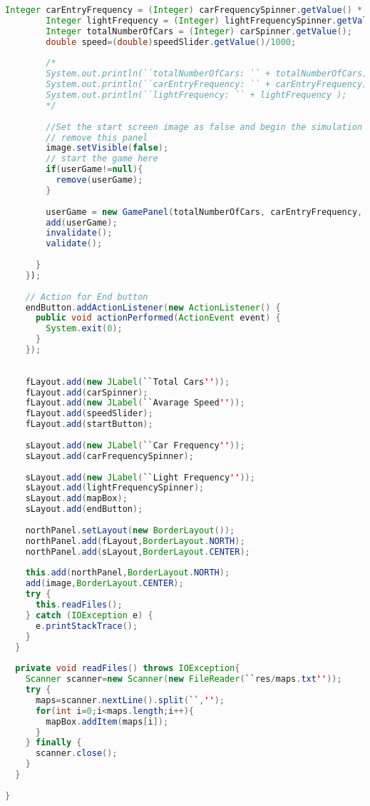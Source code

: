 \begin{lstlisting}[language=java]
        Integer carEntryFrequency = (Integer) carFrequencySpinner.getValue() * 10;
        Integer lightFrequency = (Integer) lightFrequencySpinner.getValue() * 50; 
        Integer totalNumberOfCars = (Integer) carSpinner.getValue(); 
        double speed=(double)speedSlider.getValue()/1000;
        
        /*
        System.out.println(``totalNumberOfCars: `` + totalNumberOfCars);
        System.out.println(``carEntryFrequency: `` + carEntryFrequency);
        System.out.println(``lightFrequency: `` + lightFrequency );
        */
        
        //Set the start screen image as false and begin the simulation 
        // remove this panel
        image.setVisible(false);
        // start the game here
        if(userGame!=null){
          remove(userGame);
        }
        
        userGame = new GamePanel(totalNumberOfCars, carEntryFrequency, lightFrequency,maps,mapBox.getSelectedIndex(),speed);
        add(userGame);
        invalidate();
        validate();
        
      }
    });
    
    // Action for End button 
    endButton.addActionListener(new ActionListener() {
      public void actionPerformed(ActionEvent event) {
        System.exit(0);
      }
    });
    
    
    fLayout.add(new JLabel(``Total Cars''));
    fLayout.add(carSpinner);
    fLayout.add(new JLabel(``Avarage Speed''));
    fLayout.add(speedSlider);
    fLayout.add(startButton);
    
    sLayout.add(new JLabel(``Car Frequency''));
    sLayout.add(carFrequencySpinner);
    
    sLayout.add(new JLabel(``Light Frequency''));
    sLayout.add(lightFrequencySpinner);
    sLayout.add(mapBox);
    sLayout.add(endButton);
    
    northPanel.setLayout(new BorderLayout());
    northPanel.add(fLayout,BorderLayout.NORTH);
    northPanel.add(sLayout,BorderLayout.CENTER);
    
    this.add(northPanel,BorderLayout.NORTH);
    add(image,BorderLayout.CENTER);
    try {
      this.readFiles();
    } catch (IOException e) {
      e.printStackTrace();
    }
  }
  
  private void readFiles() throws IOException{
    Scanner scanner=new Scanner(new FileReader(``res/maps.txt''));
    try {
      maps=scanner.nextLine().split(``,'');
      for(int i=0;i<maps.length;i++){
        mapBox.addItem(maps[i]);
      }
    } finally {
      scanner.close();
    }
  }
  
}

\end{lstlisting}
\newpage




